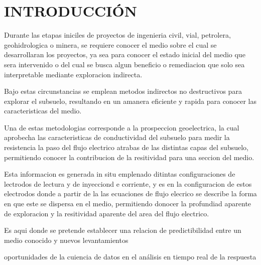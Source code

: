 \chapter{INTRODUCCIÓN}
Durante las etapas iniciles de proyectos de ingenieria civil, vial, petrolera, geohidrologica o minera, se requiere conocer el medio sobre el cual se desarrollaran los proyectos, ya sea para conocer el estado inicial del medio que sera intervenido o del cual se busca algun beneficio o remediacion que solo sea interpretable mediante exploracion indirecta.

Bajo estas circunstancias se emplean metodos indirectos no destructivos para explorar el subsuelo, resultando en un amanera eficiente y rapida para conocer las caracteristicas del medio.

Una de estas metodologias corresponde a la prospeccion geoelectrica, la cual aprobecha las caracteristicas de conductividad del subsuelo para medir la resistencia la paso del flujo electrico atrabas de las distintas capas del subsuelo, permitiendo conocer la contribucion de la resitividad para una seccion del medio.

Esta informacion es generada in situ emplenado ditintas configuraciones de lectrodos de lectura y de inyecciond e corriente, y es en la configuracion de estos electrodos donde a partir de la las ecuaciones de flujo elecrico se describe la forma en que este se dispersa en el medio, permitiendo donocer la profundiad aparente de exploracion y la resitividad aparente del area del flujo electrico.

Es aqui donde se pretende establecer una relacion de predictibilidad entre un medio conocido y nuevos levantamientos
 


oportunidades de la cuiencia de datos en el análisis en tiempo real de la respuesta 



